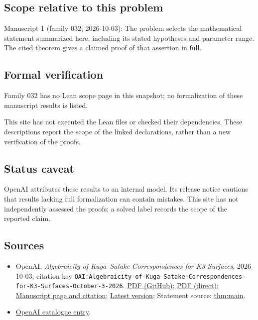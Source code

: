 \documentclass[11pt]{article}
\begin{document}
\subsection{Scope relative to this problem}
Manuscript 1 (family 032, 2026-10-03): The problem selects the mathematical statement summarized here, including its stated hypotheses and parameter range. The cited theorem gives a claimed proof of that assertion in full.

\subsection{Formal verification}
Family 032 has no Lean scope page in this snapshot; no formalization of these manuscript results is listed.

This site has not executed the Lean files or checked their dependencies. These descriptions report the scope of the linked declarations, rather than a new verification of the proofs.

\subsection{Status caveat}
OpenAI attributes these results to an internal model. Its release notice cautions that results lacking full formalization can contain mistakes. This site has not independently assessed the proofs; a solved label records the scope of the reported claim.

\subsection{Sources}
\begin{itemize}
\item OpenAI, \emph{Algebraicity of Kuga–Satake Correspondences for K3 Surfaces}, 2026-10-03; citation key \texttt{OAI:Algebraicity-of-Kuga-Satake-Correspondences-for-K3-Surfaces-October-3-2026}. \href{https://github.com/openai/math/blob/adc7f1241b42e322a6451854ab7e4b4c146bf78a/preprints/Algebraicity-of-Kuga-Satake-Correspondences-for-K3-Surfaces-October-3-2026/manuscript.pdf}{PDF (GitHub)}; \href{https://github.com/openai/math/raw/adc7f1241b42e322a6451854ab7e4b4c146bf78a/preprints/Algebraicity-of-Kuga-Satake-Correspondences-for-K3-Surfaces-October-3-2026/manuscript.pdf}{PDF (direct)}; \href{https://github.com/openai/math/blob/adc7f1241b42e322a6451854ab7e4b4c146bf78a/preprints/Algebraicity-of-Kuga-Satake-Correspondences-for-K3-Surfaces-October-3-2026/README.md}{Manuscript page and citation}; \href{https://github.com/openai/math/blob/main/preprints/Algebraicity-of-Kuga-Satake-Correspondences-for-K3-Surfaces-October-3-2026/manuscript.pdf}{Latest version}; Statement source: \href{https://github.com/openai/math/blob/adc7f1241b42e322a6451854ab7e4b4c146bf78a/preprints/Algebraicity-of-Kuga-Satake-Correspondences-for-K3-Surfaces-October-3-2026/build/manuscript.tex\#L109}{thm:main}.
\item \href{https://github.com/openai/math/blob/adc7f1241b42e322a6451854ab7e4b4c146bf78a/CONTENTS.md}{OpenAI catalogue entry}.
\end{itemize}
\end{document}
